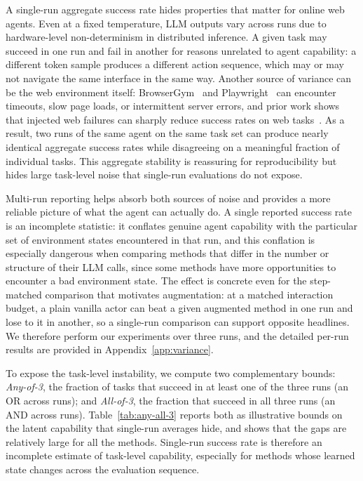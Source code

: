  A single-run aggregate success rate hides properties that matter for online web agents.
Even at a fixed temperature, LLM outputs vary across runs due to hardware-level non-determinism in distributed inference.
A given task may succeed in one run and fail in another for reasons unrelated to agent capability: a different token sample produces a different action sequence, which may or may not navigate the same interface in the same way.
Another source of variance can be the web environment itself: BrowserGym~\citep{chezelles-etal-2025-browsergym} and Playwright~\citep{playwright} can encounter timeouts, slow page loads, or intermittent server errors, and prior work shows that injected web failures can sharply reduce success rates on web tasks~\citep{kara-etal-2025-waber, kara-etal-2025-warex}.
As a result, two runs of the same agent on the same task set can produce nearly identical aggregate success rates while disagreeing on a meaningful fraction of individual tasks.
This aggregate stability is reassuring for reproducibility but hides large task-level noise that single-run evaluations do not expose.

Multi-run reporting helps absorb both sources of noise and provides a more reliable picture of what the agent can actually do.
A single reported success rate is an incomplete statistic: it conflates genuine agent capability with the particular set of environment states encountered in that run, and this conflation is especially dangerous when comparing methods that differ in the number or structure of their LLM calls, since some methods have more opportunities to encounter a bad environment state. The effect is concrete even for the step-matched comparison that motivates augmentation: at a matched interaction budget, a plain vanilla actor can beat a given augmented method in one run and lose to it in another, so a single-run comparison can support opposite headlines. We therefore perform our experiments over three runs, and the detailed per-run results are provided in Appendix~\ref{app:variance}.

 To expose the task-level instability, we compute two complementary bounds:
\emph{Any-of-3}, the fraction of tasks that succeed in at least one of the three runs (an OR across runs); and
\emph{All-of-3}, the fraction that succeed in all three runs (an AND across runs).
Table~\ref{tab:any-all-3} reports both as illustrative bounds on the latent capability that single-run averages hide, and shows that the gaps are relatively large for all the methods.
Single-run success rate is therefore an incomplete estimate of task-level capability, especially for methods whose learned state changes across the evaluation sequence.

